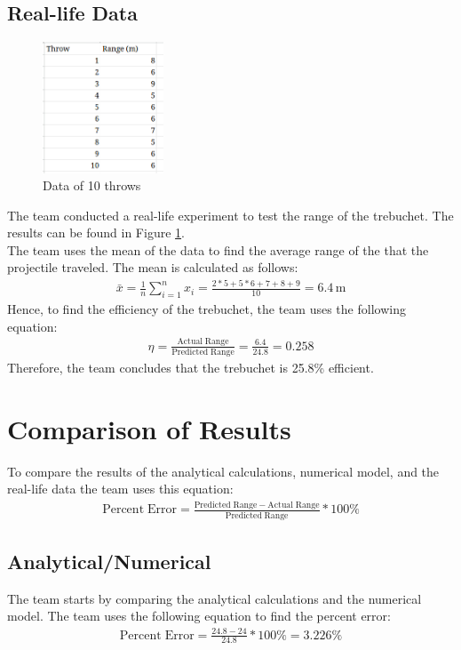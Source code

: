 \documentclass[12pt, titlepage]{article}
\begin{document}
    \subsection{Real-life Data}
    \begin{figure}[b]                                  
    \centering
    \includegraphics[width=0.32\textwidth]{figures/table.png}
    \caption{Data of 10 throws\label{table}}
    \end{figure}
    The team conducted a real-life experiment to test the range of the
    trebuchet. The results can be found in Figure \ref{table}.\\[10pt]
    The team uses the mean of the data to find the average range of the
    that the projectile traveled. The mean is calculated as follows:
    \begin{align*}
        \bar{x} = \frac{1}{n}\sum_{i=1}^{n}x_i = \frac{2*5 + 5*6 + 7 + 8 + 9}{10} = 6.4  \, \mathrm{m}
    \end{align*}
    Hence, to find the efficiency of the trebuchet, the team uses the following equation:
    \begin{align*}
        \eta = \frac{\mathrm{Actual\;Range}}{\mathrm{Predicted\;Range}} = \frac{6.4}{24.8} = 0.258
    \end{align*}
    Therefore, the team concludes that the trebuchet is 25.8\% efficient.
    \newpage
    \section{Comparison of Results}
    To compare the results of the analytical calculations, numerical model, and the real-life data the team uses this equation:
    \begin{align*}
        \mathrm{Percent\;Error} = \frac{\mathrm{Predicted\;Range} - \mathrm{Actual\;Range}}{\mathrm{Predicted\;Range}} * 100\%
    \end{align*}
    \subsection{Analytical/Numerical}
    The team starts by comparing the analytical calculations and the numerical model. The team uses the following equation to find the percent error:
    \begin{align*}
        \mathrm{Percent\;Error} = \frac{24.8 - 24}{24.8} * 100\% = 3.226\%
    \end{align*}
\end{document}
